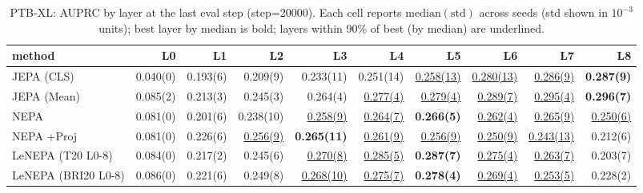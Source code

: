 \begin{table}[t]
\centering
\scriptsize
\caption{PTB-XL: AUPRC by layer at the last eval step (step=20000). Each cell reports $\mathrm{median}(\mathrm{std})$ across seeds (std shown in $10^{-3}$ units); best layer by median is bold; layers within 90\% of best (by median) are underlined.}
\label{tab:ptbxl_last_step_by_layer_auprc}
\begin{tabular}{lrrrrrrrrr}
\toprule
method & L0 & L1 & L2 & L3 & L4 & L5 & L6 & L7 & L8 \\
\midrule
JEPA (CLS) & 0.040(0) & 0.193(6) & 0.209(9) & 0.233(11) & 0.251(14) & \underline{0.258(13)} & \underline{0.280(13)} & \underline{0.286(9)} & \textbf{0.287(9)} \\
JEPA (Mean) & 0.085(2) & 0.213(3) & 0.245(3) & 0.264(4) & \underline{0.277(4)} & \underline{0.279(4)} & \underline{0.289(7)} & \underline{0.295(4)} & \textbf{0.296(7)} \\
NEPA & 0.081(0) & 0.201(6) & 0.238(10) & \underline{0.258(9)} & \underline{0.264(7)} & \textbf{0.266(5)} & \underline{0.262(4)} & \underline{0.265(9)} & \underline{0.250(6)} \\
NEPA +Proj & 0.081(0) & 0.226(6) & \underline{0.256(9)} & \textbf{0.265(11)} & \underline{0.261(9)} & \underline{0.256(9)} & \underline{0.250(9)} & \underline{0.243(13)} & 0.212(6) \\
LeNEPA (T20 L0-8) & 0.084(0) & 0.217(2) & 0.245(6) & \underline{0.270(8)} & \underline{0.285(5)} & \textbf{0.287(7)} & \underline{0.275(4)} & \underline{0.263(7)} & 0.203(7) \\
LeNEPA (BRI20 L0-8) & 0.086(0) & 0.221(6) & 0.249(8) & \underline{0.268(10)} & \underline{0.275(7)} & \textbf{0.278(4)} & \underline{0.269(4)} & \underline{0.253(5)} & 0.228(2) \\
\bottomrule
\end{tabular}
\end{table}
